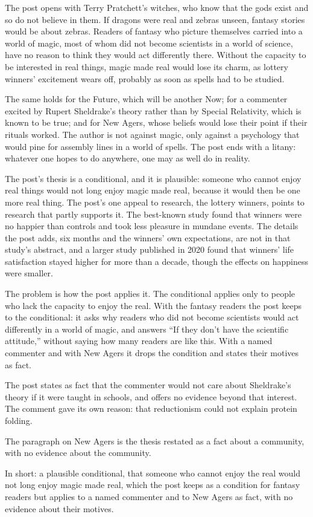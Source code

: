 \begin{afterword}
\summaryhead

The post opens with Terry Pratchett's witches, who know that the gods exist and so do not believe in them. If dragons were real and zebras unseen, fantasy stories would be about zebras. Readers of fantasy who picture themselves carried into a world of magic, most of whom did not become scientists in a world of science, have no reason to think they would act differently there. Without the capacity to be interested in real things, magic made real would lose its charm, as lottery winners' excitement wears off, probably as soon as spells had to be studied.

The same holds for the Future, which will be another Now; for a commenter excited by Rupert Sheldrake's theory rather than by Special Relativity, which is known to be true; and for New Agers, whose beliefs would lose their point if their rituals worked. The author is not against magic, only against a psychology that would pine for assembly lines in a world of spells. The post ends with a litany: whatever one hopes to do anywhere, one may as well do in reality.

\responsehead

The post's thesis is a conditional, and it is plausible: someone who cannot enjoy real things would not long enjoy magic made real, because it would then be one more real thing. The post's one appeal to research, the lottery winners, points to research that partly supports it. The best-known study found that winners were no happier than controls and took less pleasure in mundane events. The details the post adds, six months and the winners' own expectations, are not in that study's abstract, and a larger study published in 2020 found that winners' life satisfaction stayed higher for more than a decade, though the effects on happiness were smaller.

The problem is how the post applies it. The conditional applies only to people who lack the capacity to enjoy the real. With the fantasy readers the post keeps to the conditional: it asks why readers who did not become scientists would act differently in a world of magic, and answers ``If they don't have the scientific attitude,'' without saying how many readers are like this. With a named commenter and with New Agers it drops the condition and states their motives as fact.

The post states as fact that the commenter would not care about Sheldrake's theory if it were taught in schools, and offers no evidence beyond that interest. The comment gave its own reason: that reductionism could not explain protein folding.

The paragraph on New Agers is the thesis restated as a fact about a community, with no evidence about the community.

In short: a plausible conditional, that someone who cannot enjoy the real would not long enjoy magic made real, which the post keeps as a condition for fantasy readers but applies to a named commenter and to New Agers as fact, with no evidence about their motives.
\end{afterword}

